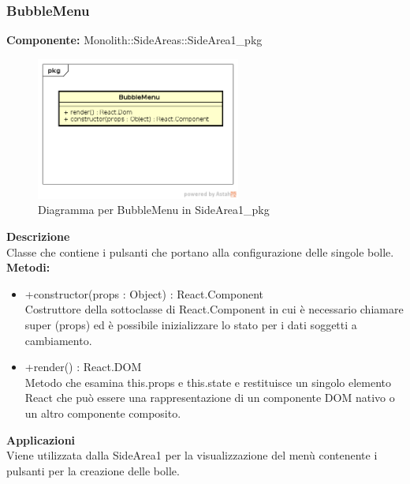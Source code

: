 \subsubsection{BubbleMenu}
\textbf{Componente:}  Monolith::SideAreas::SideArea1\_pkg\\
   \FloatBarrier
   \begin{figure}[ht]
   \centering
   \includegraphics[width=0.6\textwidth]{img/single-BubbleMenu}
   \caption{{Diagramma per BubbleMenu in SideArea1\_pkg}}
\end{figure}
\FloatBarrier
\textbf{Descrizione}\\
Classe che contiene i pulsanti che portano alla configurazione delle singole bolle.
\textbf{Metodi:} 
\begin{itemize}
\item +constructor(props : Object) : React.Component 
\\
Costruttore della sottoclasse di React.Component in cui è necessario chiamare super (props) ed è possibile inizializzare lo stato per i dati soggetti a cambiamento.
\item +render() : React.DOM 
\\
Metodo che esamina this.props e this.state e restituisce un singolo elemento React che può essere una rappresentazione di un componente DOM nativo o un altro componente composito.
\end{itemize} 


\textbf{Applicazioni}\\
Viene utilizzata dalla SideArea1 per la visualizzazione del menù contenente i pulsanti per la creazione delle bolle. 


\clearpage

